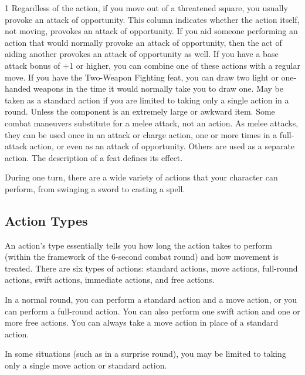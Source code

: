 \begin{table}[]
\begin{tabular}{ll}
\end{tabular}
1 Regardless of the action, if you move out of a threatened square, you usually provoke an attack of opportunity. This column indicates whether the action itself, not moving, provokes an attack of opportunity. If you aid someone performing an action that would normally provoke an attack of opportunity, then the act of aiding another provokes an attack of opportunity as well. If you have a base attack bonus of +1 or higher, you can combine one of these actions with a regular move. If you have the Two-Weapon Fighting feat, you can draw two light or one-handed weapons in the time it would normally take you to draw one. May be taken as a standard action if you are limited to taking only a single action in a round. Unless the component is an extremely large or awkward item. Some combat maneuvers substitute for a melee attack, not an action. As melee attacks, they can be used once in an attack or charge action, one or more times in a full-attack action, or even as an attack of opportunity. Others are used as a separate action. The description of a feat defines its effect.
\end{table}

				
During one turn, there are a wide variety of actions that your character can perform, from swinging a sword to casting a spell.
				
\subsection{Action Types}

				
An action's type essentially tells you how long the action takes to perform (within the framework of the 6-second combat round) and how movement is treated. There are six types of actions: standard actions, move actions, full-round actions, swift actions, immediate actions, and free actions.
				
In a normal round, you can perform a standard action and a move action, or you can perform a full-round action. You can also perform one swift action and one or more free actions. You can always take a move action in place of a standard action.
				
In some situations (such as in a surprise round), you may be limited to taking only a single move action or standard action.
				
